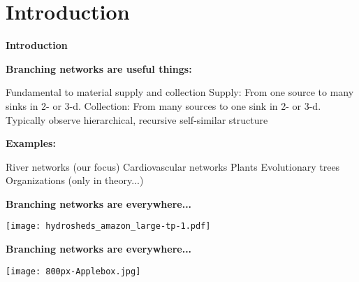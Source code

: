 \section{Introduction}

\begin{frame}[label=]
  \textbf{Introduction}

  \textbf{Branching networks are useful things:}
    
     Fundamental to material \alert{supply and collection}
     \alert{Supply:} From one source to many sinks in 2- or 3-d.
     \alert{Collection:} From many sources to one sink in 2- or 3-d.
     Typically observe hierarchical, recursive self-similar structure
    
  

  \textbf{Examples:}
    
     River networks (our focus)
     Cardiovascular networks
     Plants
     Evolutionary trees
     Organizations (only in theory...)
    
  


\begin{frame}[label=]
  \textbf{Branching networks are everywhere...}

  \begin{center}
    \texttt{[image: hydrosheds\_amazon\_large-tp-1.pdf]}\\
    {\tiny {}}
  \end{center}


\begin{frame}[label=]
  \textbf{Branching networks are everywhere...}

  \begin{center}
    \texttt{[image: 800px-Applebox.jpg]}\\
    {\tiny {}}
  \end{center}





\end{frame}
\end{frame}
\end{frame}
